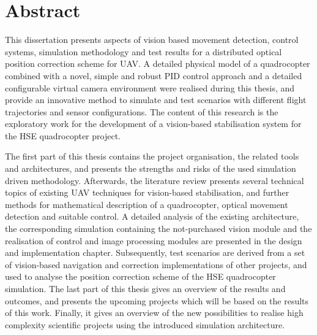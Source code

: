 \chapter*{Abstract}


This dissertation presents aspects of vision based movement detection, control systems, simulation methodology and test results for a distributed optical position correction scheme for \gls{UAV}. A detailed physical model of a quadrocopter combined with a novel, simple and robust \gls{PID} control approach and a detailed configurable virtual camera environment were realised during this thesis, and provide an innovative method to simulate and test scenarios with different flight trajectories and sensor configurations. The content of this research is the exploratory work for the development of a vision-based stabilisation system for the \gls{HSE} quadrocopter project. 

The first part of this thesis contains the project organisation, the related tools and architectures, and presents the strengths and risks of the used simulation driven methodology. Afterwards, the literature review presents several technical topics of existing \gls{UAV} techniques for vision-based stabilisation, and further methods for mathematical description of a quadrocopter, optical movement detection and suitable control. A detailed analysis of the existing architecture, the corresponding simulation containing the not-purchased vision module and the realisation of control and image processing modules are presented in the design and implementation chapter. Subsequently, test scenarios are derived from a set of vision-based navigation and correction implementations of other projects, and used to analyse the position correction scheme of the \gls{HSE} quadrocopter simulation. The last part of this thesis gives an overview of the results and outcomes, and presents the upcoming projects which will be based on the results of this work. Finally, it gives an overview of the new possibilities to realise high complexity scientific projects using the introduced simulation architecture.